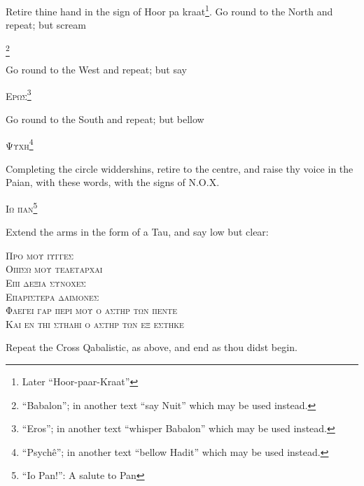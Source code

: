 Retire thine hand in the sign of Hoor pa kraat\footnote{Later \enquote{Hoor-paar-Kraat}}. Go round to the North and repeat; but scream \begin{quoting}[indentfirst=false]\textgreek{\textsc{\GreekBabalon}}\footnote{\enquote{Babalon}; in another text \enquote{say Nuit} which may be used instead.} \end{quoting}

Go round to the West and repeat; but say \begin{quoting}[indentfirst=false]\textgreek{\textsc{Ερωσ}}\footnote{\enquote{Eros}; in another text \enquote{whisper Babalon} which may be used instead.} \end{quoting}

Go round to the South and repeat; but bellow \begin{quoting}[indentfirst=false]\textgreek{\textsc{Ψυχη}}\footnote{\enquote{Psych\^e}; in another text \enquote{bellow Hadit} which may be used instead.} \end{quoting}

Completing the circle widdershins, retire to the centre, and raise thy voice in the Paian, with these words, with the signs of N.O.X. \begin{quoting}[indentfirst=false]\textgreek{\textsc{Ιω παν}}\footnote{\enquote{Io Pan!}: A salute to Pan}\end{quoting}

Extend the arms in the form of a Tau, and say low but clear:

\begin{quoting}[indentfirst=false]
\textgreek{\textsc{Προ μου ιυγγεσ}} \\
\textgreek{\textsc{Οπισω μου τελεταρχαι}} \\
\textgreek{\textsc{Επι δεξια συνοχεσ}} \\
\textgreek{\textsc{Επαριστερα δαιμονεσ}} \\
\textgreek{\textsc{Φλεγει γαρ περι μου ο αστηρ των πεντε}} \\
\textgreek{\textsc{Και εν τηι στηληι ο αστηρ των εξ εστηκε}}\footnotemark
\end{quoting}

Repeat the Cross Qabalistic, as above, and end as thou didst begin.
